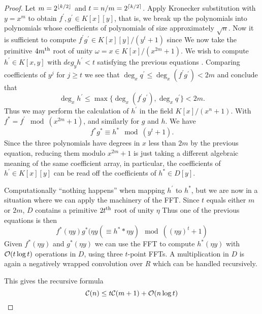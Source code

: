 \begin{proof}
    Let $m = 2^{\left \lfloor k / 2 \right \rfloor}$ and $t = n/m = 2^{\left \lceil k/2 \right \rceil}$. Apply Kronecker substitution with $y = x^m$ to obtain $f^\prime, g^\prime \in K[x][y]$, that is, we break up the polynomials into polynomials whose coefficients of polynomials of size approximately $\sqrt{n}$. Now it is sufficient to compute $f^\prime g^\prime \in K[x][y] /(y^t + 1)$ since
    We now take the primitive $4m^{\textrm{th}}$ root of unity $\omega = x \in K[x] / (x^{2m} + 1)$. We wish to compute $h^\prime \in K[x, y]$ with $deg_y h^\prime < t$ satisfying the previous equations . Comparing coefficients of $y^j$ for $j \ge t$ we see that $\deg_x q^\prime \le \deg_x (f^\prime g^\prime) < 2m$ and conclude that 
    \[
        \deg_x h^\prime \le \max \{ \deg_x(f^\prime g^\prime), \deg_x q^\prime \} < 2m.
    \]
    Thus we may perform the calculation of $h^\prime$ in the field $K[x]/(x^n + 1)$.
    With $f^\ast = f^\prime \mod (x^{2m} + 1)$, and similarly for $g$ and $h$. We have
    \[
        f^\ast g^\ast \equiv h^\ast \mod (y^t + 1).
    \]
    Since the three polynomials have degrees in $x$ less than $2m$ by the previous equation, reducing them modulo $x^{2m} + 1$ is just taking a different algebraic meaning of the same coefficient array, in particular, the coefficients of $h^\prime \in K[x][y]$ can be read off the coefficients of $h^\ast \in D[y]$.

    Computationally ``nothing happens'' when mapping $h^\prime$ to $h^\ast$, but we are now in a situation where we can apply the machinery of the FFT. Since $t$ equals either $m$ or $2m$, $D$ contains a primitive $2t^{\textrm{th}}$ root of unity $\eta$
    Thus one of the previous equations is then
    \[
        f^\ast(\eta y)g^\ast(\eta y( \equiv h^\ast*\eta y) \mod ((\eta y)^t + 1)
    \]
    Given $f^\ast(\eta y)$ and $g^\ast(\eta y)$ we can use the FFT to compute $h^\ast(\eta y)$ with $\mathcal O(t \log t)$ operations in $D$, using three $t$-point FFTs. A multiplication in $D$ is again a negatively wrapped convolution over $R$ which can be handled recursively.

    This gives the recursive formula
    \[
        \mathcal C(n) \le t\mathcal C(m + 1) + \mathcal O(n\log t)
    \]
\end{proof}

